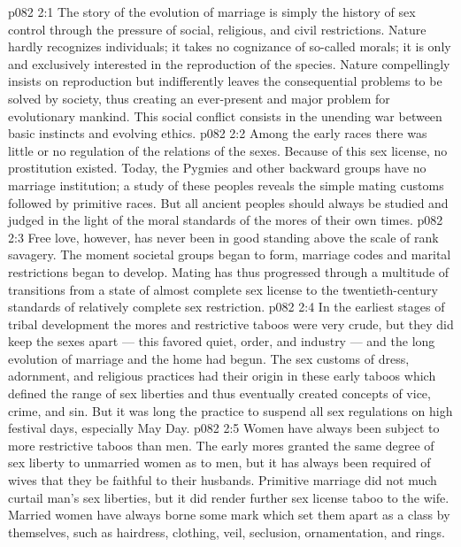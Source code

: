 \vs p082 2:1 The story of the evolution of marriage is simply the history of sex control through the pressure of social, religious, and civil restrictions. Nature hardly recognizes individuals; it takes no cognizance of so\hyp{}called morals; it is only and exclusively interested in the reproduction of the species. Nature compellingly insists on reproduction but indifferently leaves the consequential problems to be solved by society, thus creating an ever\hyp{}present and major problem for evolutionary mankind. This social conflict consists in the unending war between basic instincts and evolving ethics.
\vs p082 2:2 \pc Among the early races there was little or no regulation of the relations of the sexes. Because of this sex license, no prostitution existed. Today, the Pygmies and other backward groups have no marriage institution; a study of these peoples reveals the simple mating customs followed by primitive races. But all ancient peoples should always be studied and judged in the light of the moral standards of the mores of their own times.
\vs p082 2:3 Free love, however, has never been in good standing above the scale of rank savagery. The moment societal groups began to form, marriage codes and marital restrictions began to develop. Mating has thus progressed through a multitude of transitions from a state of almost complete sex license to the twentieth\hyp{}century standards of relatively complete sex restriction.
\vs p082 2:4 In the earliest stages of tribal development the mores and restrictive taboos were very crude, but they did keep the sexes apart --- this favored quiet, order, and industry --- and the long evolution of marriage and the home had begun. The sex customs of dress, adornment, and religious practices had their origin in these early taboos which defined the range of sex liberties and thus eventually created concepts of vice, crime, and sin. But it was long the practice to suspend all sex regulations on high festival days, especially May Day.
\vs p082 2:5 \pc Women have always been subject to more restrictive taboos than men. The early mores granted the same degree of sex liberty to unmarried women as to men, but it has always been required of wives that they be faithful to their husbands. Primitive marriage did not much curtail man’s sex liberties, but it did render further sex license taboo to the wife. Married women have always borne some mark which set them apart as a class by themselves, such as hairdress, clothing, veil, seclusion, ornamentation, and rings.
